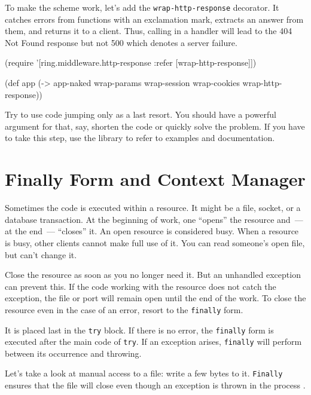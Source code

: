 
To make the scheme work, let's add the \verb|wrap-http-response| decorator. It catches errors from functions with an exclamation mark, extracts an answer from them, and returns it to a client. Thus, calling  in a handler will lead to the 404 Not Found response but not 500 which denotes a server failure.

\begin{clojure}
(require '[ring.middleware.http-response
           :refer [wrap-http-response]])

(def app
  (-> app-naked
      wrap-params
      wrap-session
      wrap-cookies
      wrap-http-response))
\end{clojure}

Try to use code jumping only as a last resort. You should have a powerful argument for that, say, shorten the code or quickly solve the problem. If you have to take this step, use the library to refer to examples and documentation.


\section{Finally Form and Context Manager}

Sometimes the code is executed within a resource. It might be a file, socket, or a database transaction. At the beginning of work, one ``opens'' the resource and~--- at the end~--- ``closes'' it. An open resource is considered busy. When a resource is busy, other clients cannot make full use of it. You can read someone's open file, but can't change it.

Close the resource as soon as you no longer need it. But an unhandled exception can prevent this. If the code working with the resource does not catch the exception, the file or port will remain open until the end of the work. To close the resource even in the case of an error, resort to the \verb|finally| form.

It is placed last in the \verb|try| block. If there is no error, the \verb|finally| form is executed after the main code of \verb|try|. If an exception arises, \verb|finally| will perform between its occurrence and throwing.

Let's take a look at manual access to a file: write a few bytes to it. \verb|Finally| ensures that the file will close even though an exception is thrown in the process .

